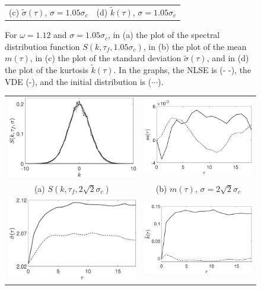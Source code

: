\documentclass[a4paper,11pt]{article}
\begin{document}
\begin{figure}[!ht]
\begin{tabular}{cc}
(c) $\tilde{\sigma}(\tau)$, $\sigma = 1.05\sigma_{c}$ & (d) $\tilde{k}(\tau)$, $\sigma = 1.05\sigma_{c}$\\
\end{tabular}
\caption{For $\omega=1.12$ and $\sigma=1.05 \sigma_{c}$, in (a) the plot of the spectral distribution function $S(k,\tau_{f},1.05\sigma_{c})$, in (b) the plot of the mean $m(\tau)$, in (c) the plot of the standard deviation $\tilde{\sigma}(\tau)$, and in (d) the plot of the kurtosis $\tilde{k}(\tau)$.  In the graphs, the NLSE is (- -), the VDE (-), and the initial distribution is ($\cdots$).}
\label{fig:stbleom1}
\end{figure}

\begin{figure}[!ht]
\centering
\begin{tabular}{cc}
\includegraphics[width=.48\textwidth]{pdf_w_1pt12_ep_pt05_Nens_512_sig0_2sqrt2} & \includegraphics[width=.48\textwidth]{mean_w_1pt12_ep_pt05_Nens_512_sig0_2sqrt2} \\
(a) $S(k,\tau_{f},2\sqrt{2}\sigma_{c})$ & (b) $m(\tau)$, $\sigma = 2\sqrt{2}\sigma_{c}$\\
\includegraphics[width=.48\textwidth]{std_w_1pt12_ep_pt05_Nens_512_sig0_2sqrt2} & \includegraphics[width=.48\textwidth]{kts_w_1pt12_ep_pt05_Nens_512_sig0_2sqrt2} \\

\end{tabular}
\end{figure}
\end{document}
